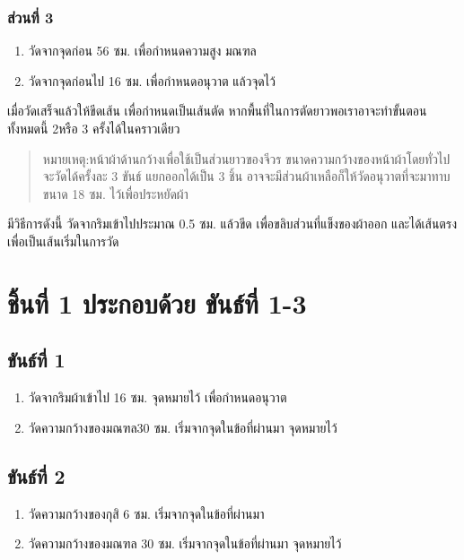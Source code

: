 \subsubsection{ส่วนที่ 3}

\begin{enumerate}
\def\labelenumi{(\arabic{enumi})}
\item
  วัดจากจุดก่อน 56 ซม. เพื่อกำหนดความสูง มณฑล
\item
  วัดจากจุดก่อนไป 16 ซม. เพื่อกำหนดอนุวาต แล้วจุดไว้
\end{enumerate}

เมื่อวัดเสร็จแล้วให้ขีดเส้น เพื่อกำหนดเป็นเส้นตัด
หากพื้นที่ในการตัดยาวพอเราอาจะทำขั้นตอนทั้งหมดนี้ 2หรือ 3 ครั้งได้ในคราวเดียว

\begin{quote}
หมายเหตุ:หน้าผ้าด้านกว้างเพื่อใช้เป็นส่วนยาวของจีวร ขนาดความกว้างของหน้าผ้าโดยทั่วไป
จะวัดได้ครั้งละ 3 ขันธ์ แยกออกได้เป็น 3 ชิ้น อาจจะมีส่วนผ้าเหลือก็ให้วัดอนุวาตที่จะมาทาบขนาด
18 ซม. ไว้เพื่อประหยัดผ้า
\end{quote}

มีวิธีการดังนี้ วัดจากริมเข้าไปประมาณ 0.5 ซม. แล้วขีด เพื่อขลิบส่วนที่แข็งของผ้าออก
และได้เส้นตรงเพื่อเป็นเส้นเริ่มในการวัด

\section{ชิ้นที่ 1 ประกอบด้วย ขันธ์ที่ 1-3}

\subsection{ขันธ์ที่ 1}

\begin{enumerate}
\def\labelenumi{(\arabic{enumi})}
\item
  วัดจากริมผ้าเข้าไป 16 ซม. จุดหมายไว้ เพื่อกำหนดอนุวาต
\item
  วัดความกว้างของมณฑล30 ซม. เริ่มจากจุดในข้อที่ผ่านมา จุดหมายไว้
\end{enumerate}

\subsection{ขันธ์ที่ 2}

\begin{enumerate}
\def\labelenumi{(\arabic{enumi})}
\item
  วัดความกว้างของกุสิ 6 ซม. เริ่มจากจุดในข้อที่ผ่านมา
\item
  วัดความกว้างของมณฑล 30 ซม. เริ่มจากจุดในข้อที่ผ่านมา จุดหมายไว้
\end{enumerate}

